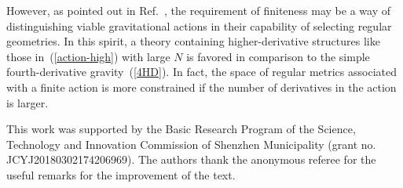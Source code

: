 \documentclass[aps,prd,a4paper,twocolumn,showpacs,showkeys,preprintnumbers,amsmath,amssymb,nofootinbib,usenames,dvipsnames]{revtex4-2}
\newcommand{\eq}[1]{(\ref{#1})}
\begin{document}
However, as pointed out in Ref.~\cite{Borissova:2020knn}, the requirement of finiteness may be a way of distinguishing viable gravitational actions in their capability of selecting regular geometries. In this spirit, a theory containing  higher-derivative structures like those in~\eq{action-high} with large $N$ is favored in comparison to the simple fourth-derivative gravity~\eq{4HD}. In fact, the space of regular metrics associated with a finite action is more constrained if the number of derivatives in the action is larger.







\acknowledgments
This work was supported by the Basic Research Program of the Science, Technology and Innovation Commission of Shenzhen Municipality (grant no. JCYJ20180302174206969). The authors thank the anonymous referee for the useful remarks for the improvement of the text.


\end{document}
